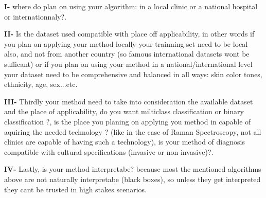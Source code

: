     \textbf{I-} where do plan on using your algorithm: in a local clinic or a national hospital or internationnaly?.
    
    \textbf{II-} Is the dataset used compatible with place off applicability, in other words if you plan on applying your method locally your trainning set need to be local also, and not from another country (so famous international datasets wont be sufficant) or if you plan on using your method in a national/international level your dataset need to be comprehensive and balanced in all ways: skin color tones, ethnicity, age, sex...etc.
    
    \textbf{III-} Thirdly your method need to take into consideration the available dataset and the place of applicability, do you want milticlass classification or binary classification ?, is the place you planing on applying you method in capable of aquiring the needed technology ? (like in the case of Raman Spectroscopy, not all clinics are capable of having such a technology), is your method of diagnosis compatible with cultural specifications (invasive or non-invasive)?.

    \textbf{IV-} Lastly, is your method interpretabe? because most the mentioned algorithms above are not naturally interpretabe (black boxes), so unless they get interpreted they cant be trusted in high stakes scenarios.


